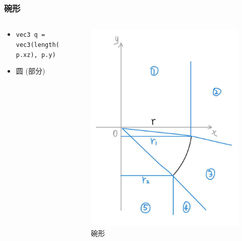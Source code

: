\documentclass[aspectratio=169]{ctexbeamer} %
\begin{document}
\begin{frame}
    \frametitle{碗形} %
    \begin{columns}
        \begin{column}{.6\textwidth}
            \begin{itemize}
                \item \texttt{vec3 q = vec3(length(p.xz), p.y)}
                \item 圆 (部分)
            \end{itemize}
        \end{column}
        \begin{column}{.4\textwidth}
            \begin{figure}[htbp]
                \centering
                \includegraphics[height=.65\textheight]{images/pre/bowl_derive.pdf}
                \caption{碗形}
                \label{fig:bowl_derive}
            \end{figure}
        \end{column}
    \end{columns}
\end{frame}
\end{document}
